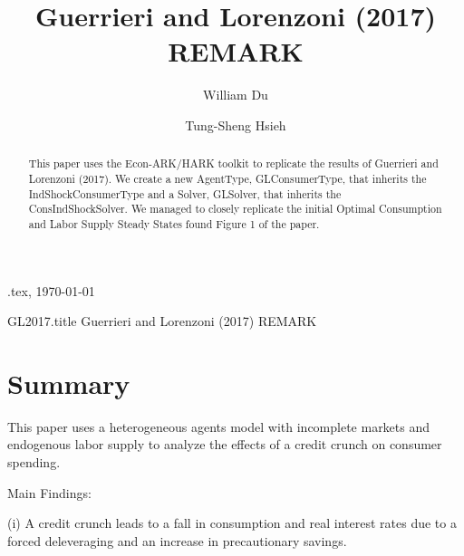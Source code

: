 \documentclass[./GL2017.tex]{subfiles}
\begin{document}
\hfill{\tiny \texname.tex, \today}

\begin{verbatimwrite}{GL2017.title}  %
Guerrieri and Lorenzoni (2017) REMARK
\end{verbatimwrite}

\title{Guerrieri and Lorenzoni (2017) \\ REMARK}

\author{William Du \and Tung-Sheng Hsieh}


\maketitle 

\hypertarget{abstract}{}
\begin{abstract}
This paper uses the Econ-ARK/HARK toolkit to replicate the results of Guerrieri and Lorenzoni (2017). We create a new AgentType, GLConsumerType, that inherits the IndShockConsumerType and a Solver, GLSolver, that inherits the ConsIndShockSolver. We managed to closely replicate the initial Optimal Consumption and Labor Supply Steady States found Figure 1 of the paper. 


\end{abstract}


\begin{authorsinfo}
\end{authorsinfo}

\titlepagefinish

\newtheorem{defn}{Definition}
\newtheorem{theorem}{Theorem}

\hypertarget{Summary}{}
\section{Summary}

This paper uses a heterogeneous agents model with incomplete markets and endogenous labor supply to analyze the effects of a credit crunch on consumer spending. 

Main Findings: 

(i) A credit crunch leads to a fall in consumption and real interest rates due to a forced deleveraging and an increase in precautionary savings.
\end{document}
